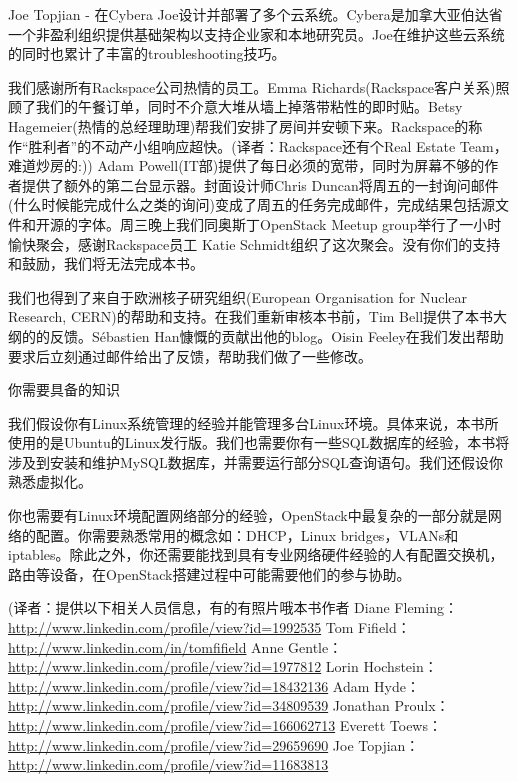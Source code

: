 \documentclass[letterpaper,10pt,english]{sphinxmanual}
\begin{document}
Joe Topjian - 在Cybera Joe设计并部署了多个云系统。Cybera是加拿大亚伯达省一个非盈利组织提供基础架构以支持企业家和本地研究员。Joe在维护这些云系统的同时也累计了丰富的troubleshooting技巧。

我们感谢所有Rackspace公司热情的员工。Emma Richards(Rackspace客户关系)照顾了我们的午餐订单，同时不介意大堆从墙上掉落带粘性的即时贴。Betsy Hagemeier(热情的总经理助理)帮我们安排了房间并安顿下来。Rackspace的称作“胜利者”的不动产小组响应超快。(译者：Rackspace还有个Real Estate Team，难道炒房的:)) Adam Powell(IT部)提供了每日必须的宽带，同时为屏幕不够的作者提供了额外的第二台显示器。封面设计师Chris Duncan将周五的一封询问邮件(什么时候能完成什么之类的询问)变成了周五的任务完成邮件，完成结果包括源文件和开源的字体。周三晚上我们同奥斯丁OpenStack Meetup group举行了一小时愉快聚会，感谢Rackspace员工 Katie Schmidt组织了这次聚会。没有你们的支持和鼓励，我们将无法完成本书。

我们也得到了来自于欧洲核子研究组织(European Organisation for Nuclear Research, CERN)的帮助和支持。在我们重新审核本书前，Tim Bell提供了本书大纲的的反馈。Sébastien Han慷慨的贡献出他的blog。Oisin Feeley在我们发出帮助要求后立刻通过邮件给出了反馈，帮助我们做了一些修改。

你需要具备的知识

我们假设你有Linux系统管理的经验并能管理多台Linux环境。具体来说，本书所使用的是Ubuntu的Linux发行版。我们也需要你有一些SQL数据库的经验，本书将涉及到安装和维护MySQL数据库，并需要运行部分SQL查询语句。我们还假设你熟悉虚拟化。

你也需要有Linux环境配置网络部分的经验，OpenStack中最复杂的一部分就是网络的配置。你需要熟悉常用的概念如：DHCP，Linux bridges，VLANs和iptables。除此之外，你还需要能找到具有专业网络硬件经验的人有配置交换机，路由等设备，在OpenStack搭建过程中可能需要他们的参与协助。

(译者：提供以下相关人员信息，有的有照片哦本书作者 Diane Fleming：\href{http://www.linkedin.com/profile/view?id=1992535}{http://www.linkedin.com/profile/view?id=1992535} Tom Fifield：\href{http://www.linkedin.com/in/tomfifield}{http://www.linkedin.com/in/tomfifield} Anne Gentle：\href{http://www.linkedin.com/profile/view?id=1977812}{http://www.linkedin.com/profile/view?id=1977812} Lorin Hochstein：\href{http://www.linkedin.com/profile/view?id=18432136}{http://www.linkedin.com/profile/view?id=18432136} Adam Hyde：\href{http://www.linkedin.com/profile/view?id=34809539}{http://www.linkedin.com/profile/view?id=34809539} Jonathan Proulx：\href{http://www.linkedin.com/profile/view?id=166062713}{http://www.linkedin.com/profile/view?id=166062713} Everett Toews：\href{http://www.linkedin.com/profile/view?id=29659690}{http://www.linkedin.com/profile/view?id=29659690} Joe Topjian：\href{http://www.linkedin.com/profile/view?id=11683813}{http://www.linkedin.com/profile/view?id=11683813}
\end{document}
